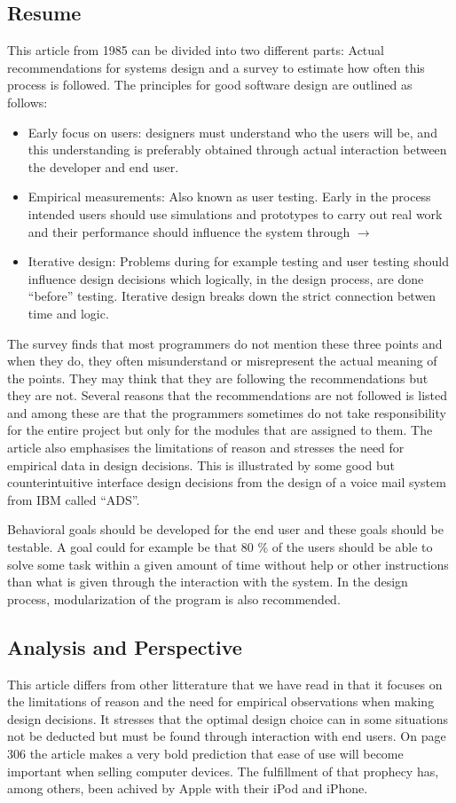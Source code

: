 \documentclass[11pt,a4paper]{report}
\begin{document}
\subsection{Resume}
This article from 1985 can be divided into two different parts: Actual recommendations for systems design and a survey to estimate how often this process is followed. The principles for good software design are outlined as follows:
\begin{itemize}
\item Early focus on users: designers must understand who the users will be, and this understanding is preferably obtained through actual interaction between the developer and end user.
\item Empirical measurements: Also known as user testing. Early in the process intended users should use simulations and prototypes to carry out real work and their performance should influence the system through $\rightarrow$
\item Iterative design: Problems during for example testing and user testing should influence design decisions which logically, in the design process, are done ``before'' testing. Iterative design breaks down the strict connection betwen time and logic.
\end{itemize}
The survey finds that most programmers do not mention these three points and when they do, they often misunderstand or misrepresent the actual meaning of the points. They may think that they are following the recommendations but they are not. Several reasons that the recommendations are not followed is listed and among these are that the programmers sometimes do not take responsibility for the entire project but only for the modules that are assigned to them. The article also emphasises the limitations of reason and stresses the need for empirical data in design decisions. This is illustrated by some good but counterintuitive interface design decisions from the design of a voice mail system from IBM called ``ADS''.

Behavioral goals should be developed for the end user and these goals should be testable. A goal could for example be that 80 \% of the users should be able to solve some task within a given amount of time without help or other instructions than what is given through the interaction with the system. In the design process, modularization of the program is also recommended.
\subsection{Analysis and Perspective}
This article differs from other litterature that we have read in that it focuses on the limitations of reason and the need for empirical observations when making design decisions. It stresses that the optimal design choice can in some situations not be deducted but must be found through interaction with end users. On page 306 the article makes a very bold prediction that ease of use will become important when selling computer devices. The fulfillment of that prophecy has, among others, been achived by Apple with their iPod and iPhone.
\end{document}
